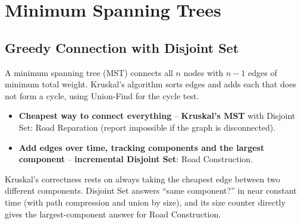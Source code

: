 \chapter{Minimum Spanning Trees}

\section{Greedy Connection with Disjoint Set}
\label{sec:cses-graph-mst-intro}

A minimum spanning tree (MST) connects all $n$ nodes with $n-1$ edges of
minimum total weight. Kruskal's algorithm sorts edges and adds each that
does not form a cycle, using Union-Find for the cycle test.

\begin{patternbox}
\begin{itemize}
  \item \textbf{Cheapest way to connect everything} -- \textbf{Kruskal's
        MST} with Disjoint Set: Road Reparation (report impossible if the
        graph is disconnected).
  \item \textbf{Add edges over time, tracking components and the largest
        component} -- \textbf{incremental Disjoint Set}: Road
        Construction.
  \end{itemize}
\end{patternbox}

\begin{ideabox}
Kruskal's correctness rests on always taking the cheapest edge between two
different components. Disjoint Set answers ``same component?'' in near
constant time (with path compression and union by size), and its size
counter directly gives the largest-component answer for Road Construction.
\end{ideabox}

\newpage



